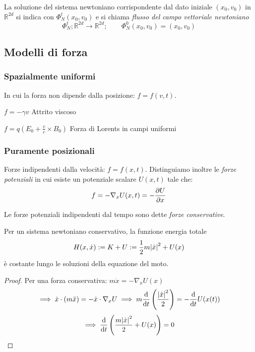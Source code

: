 \begin{definition}
    La soluzione del sistema newtoniano corrispondente dal dato iniziale $(x_0, v_0)$ in $\mathbb{R}^{2d}$ si indica con 
    $\Phi_N^t(x_0,v_0)$ e si chiama \textit{flusso del campo vettoriale newtoniano}
    \begin{equation}
        \Phi_N^t; \mathbb{R}^{2d}\rightarrow\mathbb{R}^{2d} ; \qquad \Phi_N^0 (x_0,v_0)= (x_0,v_0) 
    \end{equation}
\end{definition}





\subsection{Modelli di forza}

\subsubsection{Spazialmente uniformi}
In cui la forza non dipende dalla posizione: $f = f(v,t)$.
\begin{example}
    $f = -\gamma v $ Attrito viscoso
\end{example}
\begin{example}
    $f = q(E_0+ \frac{v}{c}\times B_0)$ Forza di Lorents in campi uniformi
\end{example}


\subsubsection{Puramente posizionali}
Forze indipendenti dalla velocità: $f= f(x,t)$. Distinguiamo inoltre le \textit{forze potenziali} in cui esiste un potenziale scalare $U(x,t)$
tale che:
\begin{equation}
    f= -\nabla_xU(x,t)= -\pdv{U}{x}(x,t)
\end{equation}

Le forze potenziali indipendenti dal tempo sono dette \textit{forze conservative}.
\begin{theorem}
    Per un sistema newtoniano conservativo, la funzione energia totale
    \begin{equation}
        H(x,\dot{x}):= K +U := \frac{1}{2}m\abs{\dot{x}}^2+U(x)
    \end{equation}
    è costante lungo le soluzioni della equazione del moto.
\end{theorem}
\begin{proof}
    Per una forza conservativa: $m\ddot{x}= -\nabla_xU(x)$
    \begin{equation*}
        \implies \dot{x}\cdot (m\ddot{x})= -\dot{x} \cdot\nabla_xU \implies m\dv{}{t}\left( \frac{\abs{\dot{x}}^2}{2} \right)= -\dv{}{t}U(x(t))
    \end{equation*}
    \begin{equation}
        \implies \dv{}{t}\left( \frac{m\abs{\dot{x}}^2}{2} +U(x) \right) = 0
    \end{equation}
\end{proof}

